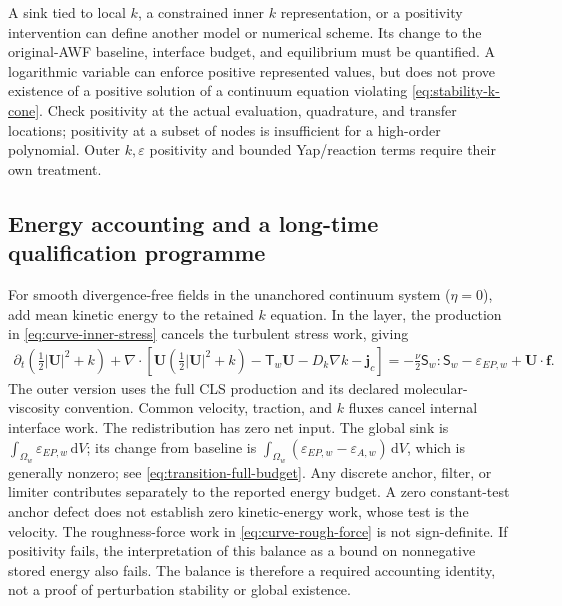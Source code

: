 \documentclass[11pt,a4paper]{article}
\numberwithin{equation}{section}
\newcommand{\dd}{\mathrm{d}}
\newcommand{\eps}{\varepsilon}
\newcommand{\Sm}{\mathsf{S}}
\newcommand{\EAw}{\eps_{A,w}}
\newcommand{\EEP}{\eps_{EP,w}}
\begin{document}
A sink tied to local $k$, a constrained inner $k$ representation, or a
positivity intervention can define another model or numerical scheme.
Its change to the original-AWF baseline, interface budget, and
equilibrium must be quantified. A logarithmic variable can enforce
positive represented values, but does not prove existence of a
positive solution of a continuum equation violating
\cref{eq:stability-k-cone}. Check positivity at the actual evaluation,
quadrature, and transfer locations; positivity at a subset of nodes
is insufficient for a high-order polynomial. Outer $k,\eps$ positivity
and bounded Yap/reaction terms require their own treatment.

\subsection{Energy accounting and a long-time qualification programme}
For smooth divergence-free fields in the unanchored continuum
system ($\eta=0$), add mean kinetic energy to the retained $k$ equation. In the layer, the production in
\cref{eq:curve-inner-stress} cancels the turbulent stress work, giving
\begin{equation}
 \begin{aligned}
 \partial_t\left(\tfrac12|\bm U|^2+k\right)
 +\nabla\cdot\left[
 \bm U\left(\tfrac12|\bm U|^2+k\right)
 -\mathsf T_w\bm U-D_k\nabla k-\bm j_c\right]
 =-\frac\nu2\Sm_w:\Sm_w-\EEP+\bm U\cdot\bm f.
 \end{aligned}
 \label{eq:stability-total-energy}
\end{equation}
The outer version uses the full CLS production and its declared
molecular-viscosity convention. Common velocity, traction, and $k$
fluxes cancel internal interface work. The redistribution has zero
net input. The global sink is $\int_{\Omega_w}\EEP\,\dd V$;
its change from baseline is $\int_{\Omega_w}(\EEP-\EAw)\,\dd V$,
which is generally nonzero; see \cref{eq:transition-full-budget}.
Any discrete anchor, filter, or limiter contributes separately to the
reported energy budget. A zero constant-test anchor defect does not
establish zero kinetic-energy work, whose test is the velocity. The roughness-force work in
\cref{eq:curve-rough-force} is not sign-definite. If positivity fails,
the interpretation of this balance as a bound on nonnegative stored
energy also fails. The balance is therefore a required accounting
identity, not a proof of perturbation stability or global existence.
\end{document}
